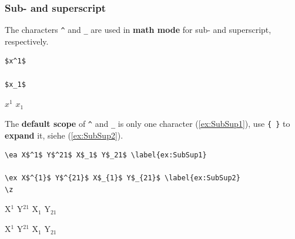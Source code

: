 \begin{frame}[fragile]
\frametitle{Sub- and superscript}

The characters \lstinline|^| and \lstinline|_| are used in \textbf{math mode} for sub- and superscript, respectively. 
	
\begin{multicols}{2}

\begin{lstlisting}
$x^1$

$x_1$
\end{lstlisting}	

\ea $x^1$
\ex $x_1$
\z 

\end{multicols}

\pause 

The \textbf{default scope} of \lstinline|^| and \lstinline|_| is only one character (\ref{ex:SubSup1}), use \lstinline|{ }| to \textbf{expand} it, siehe (\ref{ex:SubSup2}). 


\begin{lstlisting}
\ea X$^1$ Y$^21$ X$_1$ Y$_21$ \label{ex:SubSup1}

\ex X$^{1}$ Y$^{21}$ X$_{1}$ Y$_{21}$ \label{ex:SubSup2}
\z 
\end{lstlisting}


\ea X$^1$ Y$^21$ X$_1$ Y$_21$ \label{ex:SubSup1}

\ex X$^{1}$ Y$^{21}$ X$_{1}$ Y$_{21}$ \label{ex:SubSup2}
\z 

\end{frame}


